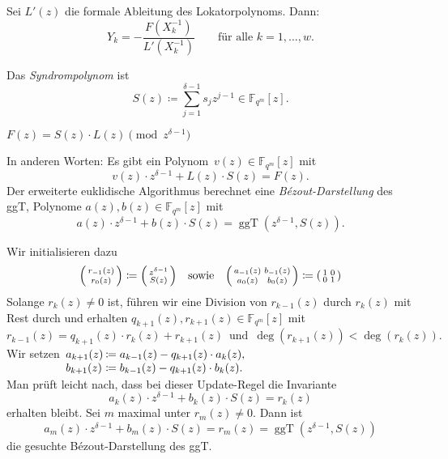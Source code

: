 \documentclass{cheat-sheet}
\newcommand{\F}{\mathbb{F}} %
\DeclareMathOperator{\ggT}{ggT} %
\begin{document}
\begin{satz}
  Sei $L'(z)$ die formale Ableitung des Lokatorpolynoms.
  Dann:
  \[
    Y_k = - \frac{F(X_k^{-1})}{L'(X_k^{-1})} \qquad
    \text{für alle } k = 1, \ldots, w.
  \]
\end{satz}

\begin{defn}
  Das \emph{Syndrompolynom} ist
  \[
    S(z) \coloneqq \sum_{j=1}^{\delta - 1} s_j z^{j-1} \in \F_{q^m} [z].
  \]
\end{defn}

\begin{prop}
  $F(z) = S(z) \cdot L(z) \pmod{z^{\delta - 1}}$
\end{prop}

\begin{bem}
  In anderen Worten: Es gibt ein Polynom~$v(z) \in \F_{q^m} [z]$ mit
  \[
    v(z) \cdot z^{\delta - 1} + L(z) \cdot S(z) = F(z).
  \]
  Der erweiterte euklidische Algorithmus berechnet eine \textit{Bézout-Darstellung} des ggT, \dh{} Polynome $a(z), b(z) \in \F_{q^m} [z]$ mit
  \[
    a(z) \cdot z^{\delta - 1} + b(z) \cdot S(z) = \ggT(z^{\delta - 1}, S(z)).
  \]
\end{bem}

\begin{alg}
  Wir initialisieren dazu
  \[
    \begin{psmallmatrix}
      r_{-1} (z) \\ r_0 (z)
    \end{psmallmatrix} \coloneqq \begin{psmallmatrix}
      z^{\delta - 1} \\ S(z)
    \end{psmallmatrix}
    \quad \text{sowie} \quad
    \begin{psmallmatrix}
      a_{-1} (z) & b_{-1} (z) \\
      a_0 (z) & b_0 (z)
    \end{psmallmatrix} \coloneqq \begin{psmallmatrix}
      1 & 0 \\
      0 & 1
    \end{psmallmatrix}
  \]
  Solange $r_k (z) \neq 0$ ist, führen wir eine Division von $r_{k-1} (z)$ durch $r_k (z)$ mit Rest durch und erhalten $q_{k+1} (z), r_{k+1} (z) \in \F_{q^m} [z]$ mit
  \[
    r_{k-1} (z) = q_{k+1} (z) \cdot r_k (z) + r_{k+1} (z)
    \enspace \text{und} \enspace
    \deg(r_{k+1} (z)) < \deg(r_k (z)).
  \]
  Wir setzen \enspace $
    \arraycolsep=1pt
    \begin{array}[t]{l l}
      a_{k+1} (z) & \coloneqq a_{k-1} (z) - q_{k+1} (z) \cdot a_k (z), \\
      b_{k+1} (z) & \coloneqq b_{k-1} (z) - q_{k+1} (z) \cdot b_k (z).
    \end{array}
  $ \\[2pt]
  Man prüft leicht nach, dass bei dieser Update-Regel die Invariante
  \[
    a_k (z) \cdot z^{\delta - 1} + b_k (z) \cdot S(z) = r_k (z)
  \]
  erhalten bleibt.
  Sei $m$ maximal unter $r_m (z) \neq 0$.
  Dann ist
  \[
    a_m (z) \cdot z^{\delta - 1} + b_m (z) \cdot S(z) = r_m (z) = \ggT(z^{\delta - 1}, S(z))
  \]
  die gesuchte Bézout-Darstellung des ggT.
\end{alg}
\end{document}
